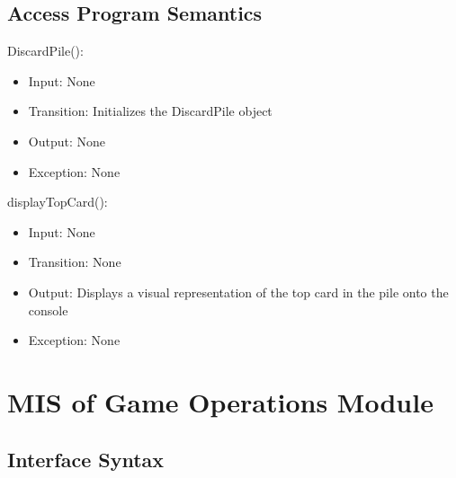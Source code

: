 \documentclass[12pt, titlepage]{article}
\begin{document}
\subsection{Access Program Semantics}
DiscardPile():
\begin{itemize}
    \item Input: None 
    \item Transition: Initializes the DiscardPile object
    \item Output: None
    \item Exception: None
\end{itemize}

\noindent displayTopCard():
\begin{itemize}
    \item Input: None 
    \item Transition: None
    \item Output: Displays a visual representation of the top card in the pile onto the console
    \item Exception: None
\end{itemize}

\section{MIS of Game Operations Module}

\subsection{Interface Syntax}
\end{document}
